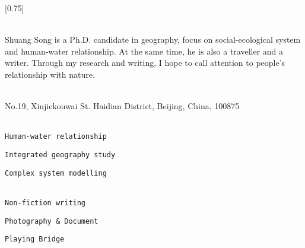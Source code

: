 \documentclass[lighthipster]{simplehipstercv}
\begin{document}
\setlength{\columnsep}{1.5cm}
[0.75]
\begin{paracol}{2}

\paracolbackgroundoptions



\footnotesize
{\setasidefontcolour
\flushright
\begin{center}
\end{center}

\\[0.5em]

Shuang Song is a Ph.D. candidate in geography, focus on social-ecological system and human-water relationship. At the same time, he is also a traveller and a writer. Through my research and writing, I hope to call attention to people's relationship with nature. 
\bigskip

 \\[0.5em]
No.19, Xinjiekouwai St. Haidian District, Beijing, China, 100875

\bigskip







\\[0.5em]

\texttt{Human-water relationship}

\texttt{Integrated geography study}

\texttt{Complex system modelling}

\bigskip
{}\\[0.5em]

\texttt{Non-fiction writing}

\texttt{Photography \& Document}

\texttt{Playing Bridge} 

\bigskip
\begin{minipage}[t]{0.2\textwidth}

\end{minipage}}
\end{paracol}
\end{document}
